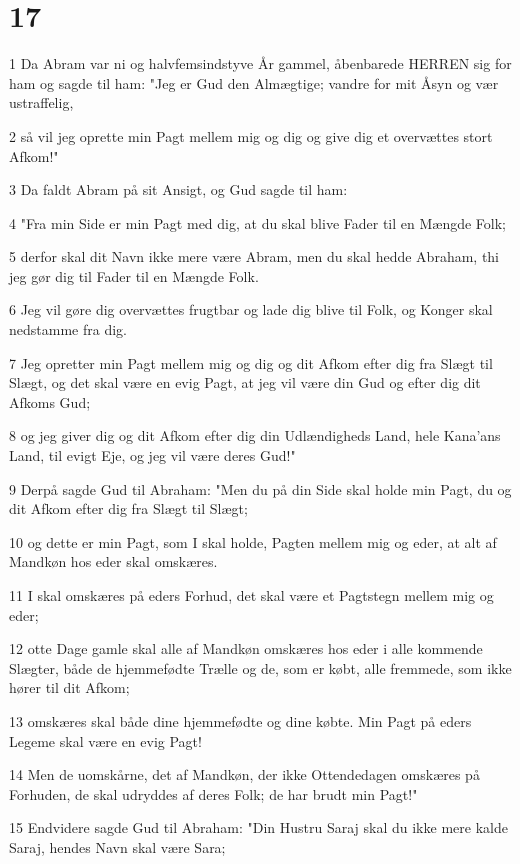 \chapter{17}

\par 1 Da Abram var ni og halvfemsindstyve År gammel, åbenbarede HERREN sig for ham og sagde til ham: "Jeg er Gud den Almægtige; vandre for mit Åsyn og vær ustraffelig,
\par 2 så vil jeg oprette min Pagt mellem mig og dig og give dig et overvættes stort Afkom!"
\par 3 Da faldt Abram på sit Ansigt, og Gud sagde til ham:
\par 4 "Fra min Side er min Pagt med dig, at du skal blive Fader til en Mængde Folk;
\par 5 derfor skal dit Navn ikke mere være Abram, men du skal hedde Abraham, thi jeg gør dig til Fader til en Mængde Folk.
\par 6 Jeg vil gøre dig overvættes frugtbar og lade dig blive til Folk, og Konger skal nedstamme fra dig.
\par 7 Jeg opretter min Pagt mellem mig og dig og dit Afkom efter dig fra Slægt til Slægt, og det skal være en evig Pagt, at jeg vil være din Gud og efter dig dit Afkoms Gud;
\par 8 og jeg giver dig og dit Afkom efter dig din Udlændigheds Land, hele Kana'ans Land, til evigt Eje, og jeg vil være deres Gud!"
\par 9 Derpå sagde Gud til Abraham: "Men du på din Side skal holde min Pagt, du og dit Afkom efter dig fra Slægt til Slægt;
\par 10 og dette er min Pagt, som I skal holde, Pagten mellem mig og eder, at alt af Mandkøn hos eder skal omskæres.
\par 11 I skal omskæres på eders Forhud, det skal være et Pagtstegn mellem mig og eder;
\par 12 otte Dage gamle skal alle af Mandkøn omskæres hos eder i alle kommende Slægter, både de hjemmefødte Trælle og de, som er købt, alle fremmede, som ikke hører til dit Afkom;
\par 13 omskæres skal både dine hjemmefødte og dine købte. Min Pagt på eders Legeme skal være en evig Pagt!
\par 14 Men de uomskårne, det af Mandkøn, der ikke Ottendedagen omskæres på Forhuden, de skal udryddes af deres Folk; de har brudt min Pagt!"
\par 15 Endvidere sagde Gud til Abraham: "Din Hustru Saraj skal du ikke mere kalde Saraj, hendes Navn skal være Sara;
